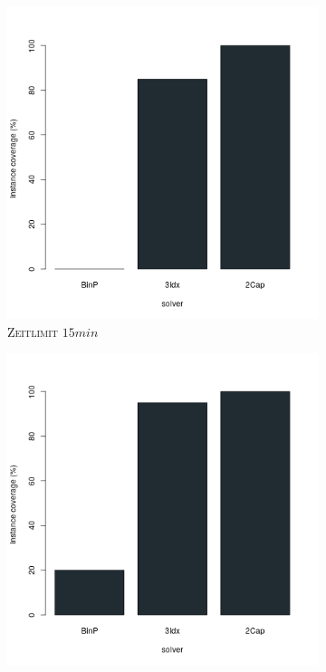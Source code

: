 \begin{figure}[H]
\centering

\begin{subfigure}[b]{0.3\textwidth}
\centering
\includegraphics[width=1.2\textwidth]{img/solver_instance_coverage_b=2_l_900s.png}
\caption{\textsc{Zeitlimit} $15min$}
\label{fig:instance_cov_b=2_l_a}
\end{subfigure}
\hfill
\begin{subfigure}[b]{0.3\textwidth}
\centering
\includegraphics[width=1.2\textwidth]{img/solver_instance_coverage_b=2_l_1350s.png}

\end{subfigure}
\end{figure}
